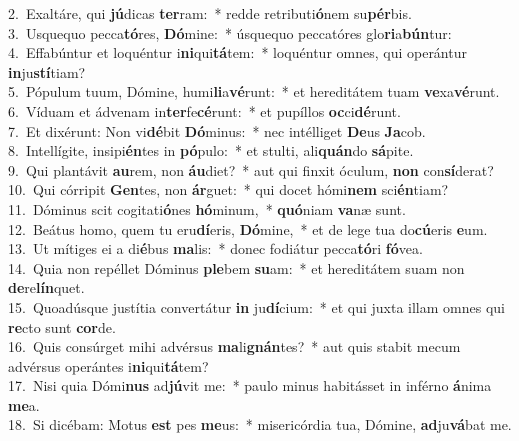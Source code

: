 {2.~}Exaltáre, qui \textbf{jú}dicas \textbf{ter}ram:~* redde retributi\textbf{ó}nem su\textbf{pér}bis.\\
{3.~}Usquequo pecca\textbf{tó}res, \textbf{Dó}mine:~* úsquequo peccatóres glo\textbf{ri}a\textbf{bún}tur:\\
{4.~}Effabúntur et loquéntur i\textbf{ni}qui\textbf{tá}tem:~* loquéntur omnes, qui operántur \textbf{in}ju\textbf{stí}tiam?\\
{5.~}Pópulum tuum, Dómine, humi\textbf{li}a\textbf{vé}runt:~* et hereditátem tuam \textbf{ve}xa\textbf{vé}runt.\\
{6.~}Víduam et ádvenam in\textbf{ter}fe\textbf{cé}runt:~* et pupíllos \textbf{oc}ci\textbf{dé}runt.\\
{7.~}Et dixérunt: Non vi\textbf{dé}bit \textbf{Dó}minus:~* nec intélliget \textbf{De}us \textbf{Ja}cob.\\
{8.~}Intellígite, insipi\textbf{én}tes in \textbf{pó}pulo:~* et stulti, ali\textbf{quán}do \textbf{sá}pite.\\
{9.~}Qui plantávit \textbf{au}rem, non \textbf{áu}diet?~* aut qui finxit óculum, \textbf{non} con\textbf{sí}derat?\\
{10.~}Qui córripit \textbf{Gen}tes, non \textbf{ár}guet:~* qui docet hómi\textbf{nem} sci\textbf{én}tiam?\\
{11.~}Dóminus scit cogitati\textbf{ó}nes \textbf{hó}minum,~* \textbf{quó}niam \textbf{va}næ sunt.\\
{12.~}Beátus homo, quem tu eru\textbf{dí}eris, \textbf{Dó}mine,~* et de lege tua do\textbf{cú}eris \textbf{e}um.\\
{13.~}Ut mítiges ei a di\textbf{é}bus \textbf{ma}lis:~* donec fodiátur pecca\textbf{tó}ri \textbf{fó}vea.\\
{14.~}Quia non repéllet Dóminus \textbf{ple}bem \textbf{su}am:~* et hereditátem suam non \textbf{de}re\textbf{lín}quet.\\
{15.~}Quoadúsque justítia convertátur \textbf{in} ju\textbf{dí}cium:~* et qui juxta illam omnes qui \textbf{re}cto sunt \textbf{cor}de.\\
{16.~}Quis consúrget mihi advérsus \textbf{ma}li\textbf{gnán}tes?~* aut quis stabit mecum advérsus operántes i\textbf{ni}qui\textbf{tá}tem?\\
{17.~}Nisi quia Dómi\textbf{nus} ad\textbf{jú}vit me:~* paulo minus habitásset in inférno \textbf{á}nima \textbf{me}a.\\
{18.~}Si dicébam: Motus \textbf{est} pes \textbf{me}us:~* misericórdia tua, Dómine, \textbf{ad}ju\textbf{vá}bat me.\\
